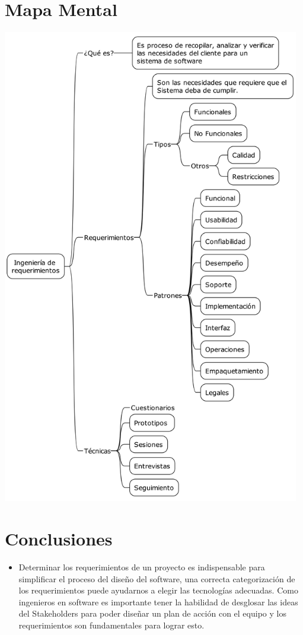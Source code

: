 \documentclass[12pt]{article}
\begin{document}
\section{Mapa Mental}
\label{sec:orgb034f7e}
\begin{center}
\includegraphics[width=130mm]{./mapa_mental.png}
\end{center}

\section{Conclusiones}
\label{sec:org99c2817}
\begin{itemize}
\item Determinar los requerimientos de un proyecto es indispensable para simplificar el proceso del diseño del software, una correcta categorización de los requerimientos puede ayudarnos a elegir las tecnologías adecuadas. Como ingenieros en software es importante tener la habilidad de desglosar las ideas del Stakeholders para poder diseñar un plan de acción con el equipo y los requerimientos son fundamentales para lograr esto.
\end{itemize}
\end{document}
